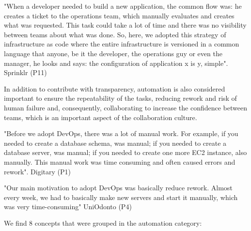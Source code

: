 "When a developer needed to build a new application, the common flow was: he creates a ticket to the operations team, which manually evaluates and creates what was requested. This task could take a lot of time and there was no visibility between teams about what was done. So, here, we adopted this strategy of infrastructure as code where the entire infrastructure is versioned in a common language that anyone, be it the developer, the operations guy or even the manager, he looks and says: the configuration of application x is y, simple". Sprinklr (P11)

In addition to contribute with transparency, automation is also considered important to ensure the repeatability of the tasks, reducing rework and risk of human failure and, consequently, collaborating to increase the confidence between teams, which is an important aspect of the collaboration culture.

"Before we adopt DevOps, there was a lot of manual work. For example, if you needed to create a database schema, was manual; if you needed to create a database server, was manual; if you needed to create one more EC2 instance, also manually. This manual work was time consuming and often caused errors and rework". Digitary (P1)

"Our main motivation to adopt DevOps was basically reduce rework. Almost every week, we had to basically make new servers and start it manually, which was very time-consuming" UniOdonto (P4)

We find 8 concepts that were grouped in the automation category:


